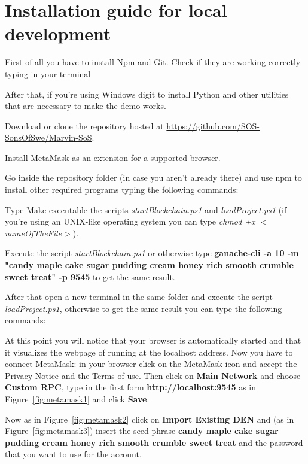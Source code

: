 \section{Installation guide for local development}
First of all you have to install \href{https://www.npmjs.com/}{Npm} and \href{https://git-scm.com/}{Git}. Check if they are working correctly typing in your terminal 

After that, if you're using Windows digit  to install Python and other utilities that are necessary to make the demo works.

Download or clone the repository hosted at \url{https://github.com/SOS-SonsOfSwe/Marvin-SoS}.

Install \href{https://metamask.io/}{MetaMask} as an extension for a supported browser.

\noindent Go inside the repository folder (in case you aren't already there) and use npm to install other required programs typing the following commands:

Type 
\label{GanacheDeployment}
Make executable the scripts \emph{startBlockchain.ps1} and \emph{loadProject.ps1} (if you're using an UNIX-like operating system you can type \emph{chmod +x $<$nameOfTheFile$>$}).

Execute the script \emph{startBlockchain.ps1} or otherwise type \textbf{ganache-cli -a 10 -m "candy maple cake sugar pudding cream honey rich smooth crumble sweet treat" -p 9545} to get the same result.

After that open a new terminal in the same folder and execute the script \emph{loadProject.ps1}, otherwise to get the same result you can type the following commands:

At this point you will notice that your browser is automatically started and that it visualizes the webpage of \ProjectName{} running at the localhost address. Now you have to connect MetaMask: in your browser click on the MetaMask icon and accept the Privacy Notice and the Terms of use. Then click on \textbf{Main Network} and choose \textbf{Custom RPC}, type in the first form \textbf{http://localhost:9545} as in Figure~\ref{fig:metamask1} and click \textbf{Save}.

Now as in Figure~\ref{fig:metamask2} click on \textbf{Import Existing DEN} and (as in Figure~\ref{fig:metamask3}) insert the seed phrase \textbf{candy maple cake sugar pudding cream honey rich smooth crumble sweet treat} and the password that you want to use for the account.

